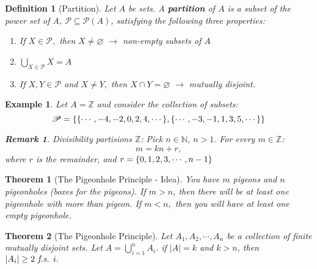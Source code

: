\documentclass[12pt,a4paper]{article}
\newtheorem{thm}{Theorem}[subsection]
\newtheorem{df}{Definition}[subsection]
\newtheorem{eg}{Example}[subsection]
\newtheorem*{rmk}{\indent Remark}
\def\Z{{\mathbb{Z}}}
\def\N{{\mathbb{N}}}
\def\pow{{\mathcal{P}}}
\def\part{{\mathscr{P}}}
\def\emptyset{\varnothing}
\def\fs{\emph{ f.s. }}
\begin{document}
\begin{df}[Partition]\label{df2.3.2}
	Let $A$ be sets. A \textbf{partition} of $A$ is a subset of the power set of A, $\part\subseteq\pow(A)$, satisfying the following three properties:
	\begin{enumerate}
		\item If $X\in\part,$ then $X\neq\emptyset$ $\longrightarrow$ non-empty subsets of $A$
		\item $\displaystyle\bigcup_{X\in\part}X=A$
		\item If $X,Y\in\part$ and $X\neq Y,$ then $X\cap Y=\emptyset$ $\longrightarrow$ mutually disjoint.
	\end{enumerate}
\end{df}
\begin{eg}
	Let $A=\Z$ and consider the collection of subsets: \[\part=\qty{\qty{\cdots,-4,-2,0,2,4,\cdots},\qty{\cdots,-3,-1,1,3,5,\cdots}}\]	
	\begin{rmk} Divisibility partisions $\Z$: Pick $n\in\N,\ n>1.$ For every $m\in\Z$: \[m=kn+r,\] where $r$ is the remainder, and $r=\qty{0,1,2,3,\cdots,n-1}$ \end{rmk}
\end{eg}
\begin{thm}[The Pigeonhole Principle - Idea]
	You have $m$ pigeons and $n$ pigeonholes (boxes for the pigeons). If $m>n$, then there will be at least one pigeonhole with more than pigeon. If $m<n,$ then you will have at least one empty pigeonhole. 
\end{thm}
\begin{thm}[The Pigeonhole Principle]
	Let $A_1,A_2,\cdots,A_n$ be a collection of finite mutually disjoint sets. Let $\displaystyle A=\bigcup_{i=1}^n A_i.$ if $|A|=k$ and $k>n$, then $|A_i|\geq2\fs i.$	
\end{thm}
\end{document}
